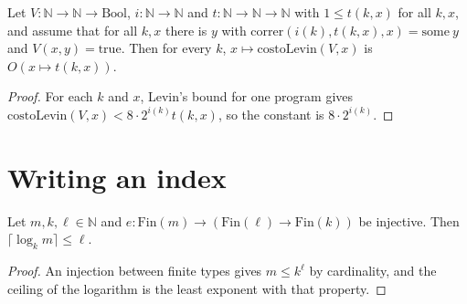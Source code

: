 \begin{theorem}
  \label{thm:information-levin-below}
  \leanok
  Let $V : \mathbb{N} \to \mathbb{N} \to \mathrm{Bool}$, $i : \mathbb{N} \to \mathbb{N}$ and
  $t : \mathbb{N} \to \mathbb{N} \to \mathbb{N}$ with $1 \le t(k, x)$ for all $k, x$, and assume
  that for all $k, x$ there is $y$ with $\mathrm{correr}(i(k), t(k, x), x) = \mathrm{some}\ y$ and
  $V(x, y) = \mathrm{true}$. Then for every $k$, $x \mapsto \mathrm{costoLevin}(V, x)$ is
  $O(x \mapsto t(k, x))$.
  \own{}
\end{theorem}

\begin{proof}
  \leanok
  For each $k$ and $x$, Levin's bound for one program gives $\mathrm{costoLevin}(V, x) < 8 \cdot
  2^{i(k)} t(k, x)$, so the constant is $8 \cdot 2^{i(k)}$.
\end{proof}

\section{Writing an index}
\label{sec:information-index}

\begin{theorem}
  \label{thm:information-write-index}
  \leanok
  Let $m, k, \ell \in \mathbb{N}$ and $e : \mathrm{Fin}(m) \to (\mathrm{Fin}(\ell) \to
  \mathrm{Fin}(k))$ be injective. Then $\lceil \log_k m \rceil \le \ell$.
  \own{}
  \infrastructure{}
\end{theorem}

\begin{proof}
  \leanok
  An injection between finite types gives $m \le k^\ell$ by cardinality, and the ceiling of the
  logarithm is the least exponent with that property.
\end{proof}
